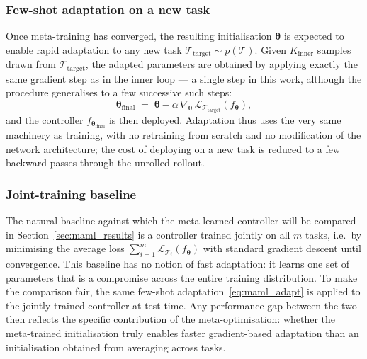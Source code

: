 \documentclass[11pt,a4paper]{article}
\theoremstyle{remark}
\numberwithin{equation}{section}
\begin{document}
\subsubsection*{Few-shot adaptation on a new task}

Once meta-training has converged, the resulting initialisation
$\boldsymbol{\theta}$ is expected to enable rapid adaptation to any new task
$\mathcal{T}_{\mathrm{target}} \sim p(\mathcal{T})$. Given $K_{\mathrm{inner}}$
samples drawn from $\mathcal{T}_{\mathrm{target}}$, the adapted parameters are
obtained by applying exactly the same gradient step as in the inner loop --- a
single step in this work, although the procedure generalises to a few successive
such steps:
\begin{equation}
\boldsymbol{\theta}_{\mathrm{final}} \;=\; \boldsymbol{\theta}
- \alpha \, \nabla_{\boldsymbol{\theta}}\,
  \mathcal{L}_{\mathcal{T}_{\mathrm{target}}}\!\left(f_{\boldsymbol{\theta}}\right),
\label{eq:maml_adapt}
\end{equation}
and the controller $f_{\boldsymbol{\theta}_{\mathrm{final}}}$ is then deployed.
Adaptation thus uses the very same machinery as training, with no retraining
from scratch and no modification of the network architecture; the cost of
deploying on a new task is reduced to a few backward passes through the
unrolled rollout.

\subsubsection*{Joint-training baseline}

The natural baseline against which the meta-learned controller will be compared
in Section~\ref{sec:maml_results} is a controller trained jointly on all $m$
tasks, i.e.\ by minimising the average loss
$\sum_{i=1}^{m} \mathcal{L}_{\mathcal{T}_i}(f_{\boldsymbol{\theta}})$ with
standard gradient descent until convergence. This baseline has no notion of
fast adaptation: it learns one set of parameters that is a compromise across
the entire training distribution. To make the comparison fair, the same
few-shot adaptation~\eqref{eq:maml_adapt} is applied to the jointly-trained
controller at test time. Any performance gap between the two then
reflects the specific contribution of the meta-optimisation: whether the
meta-trained initialisation truly enables faster gradient-based adaptation than
an initialisation obtained from averaging across tasks.
\end{document}
